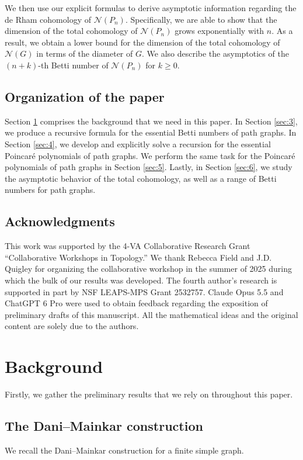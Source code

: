 \documentclass[12pt]{amsart}
\theoremstyle{definition}
\begin{document}
We then use our explicit formulas to derive asymptotic information regarding the de Rham cohomology of $\mathcal N(P_n)$. Specifically, we are able to show that the dimension of the total cohomology of $\mathcal N(P_n)$ grows exponentially with $n$. As a result, we obtain a lower bound for the dimension of the total cohomology of $\mathcal N(G)$ in terms of the diameter of $G$. We also describe the asymptotics of the $(n+k)$-th Betti number of $\mathcal N(P_n)$ for $k \geq 0$.

\subsection*{Organization of the paper} Section \ref{sec:2} comprises the background that we need in this paper. In Section \ref{sec:3}, we produce a recursive formula for the essential Betti numbers of path graphs. In Section \ref{sec:4}, we develop and explicitly solve a recursion for the essential Poincar{\'e} polynomials of path graphs. We perform the same task for the Poincar{\'e} polynomials of path graphs in Section \ref{sec:5}. Lastly, in Section \ref{sec:6}, we study the asymptotic behavior of the total cohomology, as well as a range of Betti numbers for path graphs.

\subsection*{Acknowledgments}
This work was supported by the 4-VA Collaborative Research Grant ``Collaborative Workshops in Topology.'' We thank Rebecca Field and J.D. Quigley for organizing the collaborative workshop in the summer of 2025 during which the bulk of our results was developed. The fourth author's research is supported in part by NSF LEAPS-MPS Grant 2532757. Claude Opus 5.5 and ChatGPT 6 Pro were used to obtain feedback regarding the exposition of preliminary drafts of this manuscript. All the mathematical ideas and the original content are solely due to the authors.

\section{Background}\label{sec:2}
Firstly, we gather the preliminary results that we rely on throughout this paper.

\subsection{The Dani--Mainkar construction}\label{sec:2.1} We recall the Dani--Mainkar construction for a finite simple graph.
\end{document}
